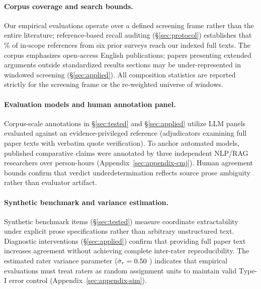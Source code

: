 \paragraph{Corpus coverage and search bounds.}
Our empirical evaluations operate over a defined screening frame rather than the entire literature; reference-based recall auditing (\S\ref{sec:protocol}) establishes that \CovRecallTextsPct\% of in-scope references from six prior surveys reach our indexed full texts. The corpus emphasizes open-access English publications; papers presenting extended arguments outside standardized results sections may be under-represented in windowed screening (\S\ref{sec:applied}). All composition statistics are reported strictly for the screening frame or the re-weighted universe of \RecUniverse{} windows.

\paragraph{Evaluation models and human annotation panel.}
Corpus-scale annotations in \S\ref{sec:tested} and \S\ref{sec:applied} utilize LLM panels evaluated against an evidence-privileged reference (adjudicators examining full paper texts with verbatim quote verification). To anchor automated models, \HumN{} published comparative claims were annotated by three independent NLP/RAG researchers over \HumHours{} person-hours (Appendix~\ref{sec:appendix-cmj}). Human agreement bounds confirm that verdict underdetermination reflects source prose ambiguity rather than evaluator artifact.

\paragraph{Synthetic benchmark and variance estimation.}
Synthetic benchmark items (\S\ref{sec:tested}) measure coordinate extractability under explicit prose specifications rather than arbitrary unstructured text. Diagnostic interventions (\S\ref{sec:applied}) confirm that providing full paper text increases agreement without achieving complete inter-rater reproducibility. The estimated rater variance parameter ($\hat\sigma_r=0.50{}$ \OwjSigPooledCI{}) indicates that empirical evaluations must treat raters as random assignment units to maintain valid Type-I error control (Appendix~\ref{sec:appendix-sim}).





